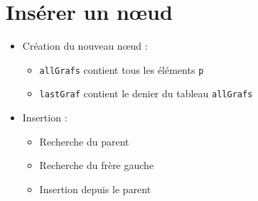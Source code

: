 \hypertarget{insuxe9rer-un-nux153ud}{%
\section{Insérer un nœud}\label{insuxe9rer-un-nux153ud}}

\begin{english}

\begin{Shaded}
\begin{Highlighting}[]
 \NormalTok{() \{}
     \OperatorTok{=} \NormalTok{(}\NormalTok{)}\OperatorTok{;}
     \OperatorTok{=} \NormalTok{(}\NormalTok{)}\OperatorTok{;}
\OperatorTok{;}
    
     \OperatorTok{=} \NormalTok{(}\NormalTok{)[}\NormalTok{]}\OperatorTok{;}
     \OperatorTok{=}\NormalTok{(}\NormalTok{)}\OperatorTok{;}
     \OperatorTok{=}\NormalTok{(}\NormalTok{)}\OperatorTok{;}             

\OperatorTok{,}\OperatorTok{;}
\NormalTok{\}}
\end{Highlighting}
\end{Shaded}

\end{english}

\begin{itemize}
\tightlist
\item
  Création du nouveau nœud :

  \begin{itemize}
  \tightlist
  \item
    \textenglish{\texttt{allGrafs}} contient tous les éléments
    \textenglish{\texttt{p}}
  \item
    \textenglish{\texttt{lastGraf}} contient le denier du tableau
    \textenglish{\texttt{allGrafs}}
  \end{itemize}
\item
  Insertion :

  \begin{itemize}
  \tightlist
  \item
    Recherche du parent
  \item
    Recherche du frère gauche
  \item
    Insertion depuis le parent
  \end{itemize}
\end{itemize}


